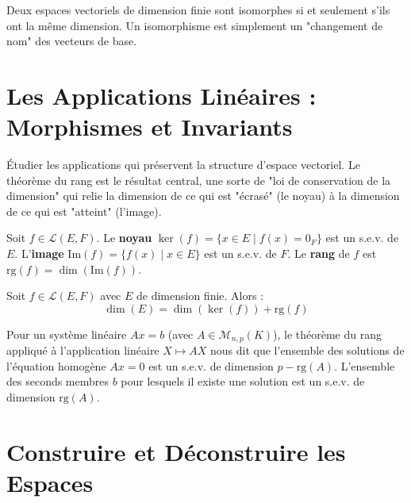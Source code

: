 \begin{proposition}
    Deux espaces vectoriels de dimension finie sont isomorphes si et seulement s'ils ont la même dimension. Un isomorphisme est simplement un "changement de nom" des vecteurs de base.
\end{proposition}

\section{Les Applications Linéaires : Morphismes et Invariants}

\begin{objectif}
    Étudier les applications qui préservent la structure d'espace vectoriel. Le théorème du rang est le résultat central, une sorte de "loi de conservation de la dimension" qui relie la dimension de ce qui est "écrasé" (le noyau) à la dimension de ce qui est "atteint" (l'image).
\end{objectif}

\begin{definition}
    Soit $f \in \mathcal{L}(E,F)$.
    Le \textbf{noyau} $\ker(f) = \{x \in E \mid f(x)=0_F\}$ est un s.e.v. de $E$.
    L'\textbf{image} $\mathrm{Im}(f) = \{f(x) \mid x \in E\}$ est un s.e.v. de $F$.
    Le \textbf{rang} de $f$ est $\mathrm{rg}(f) = \dim(\mathrm{Im}(f))$.
\end{definition}

\begin{theorem}
    Soit $f \in \mathcal{L}(E,F)$ avec $E$ de dimension finie. Alors :
    $$ \dim(E) = \dim(\ker(f)) + \mathrm{rg}(f) $$
\end{theorem}

\begin{application}
    Pour un système linéaire $Ax=b$ (avec $A \in \mathcal{M}_{n,p}(K)$), le théorème du rang appliqué à l'application linéaire $X \mapsto AX$ nous dit que l'ensemble des solutions de l'équation homogène $Ax=0$ est un s.e.v. de dimension $p - \mathrm{rg}(A)$. L'ensemble des seconds membres $b$ pour lesquels il existe une solution est un s.e.v. de dimension $\mathrm{rg}(A)$.
\end{application}

\section{Construire et Déconstruire les Espaces}

